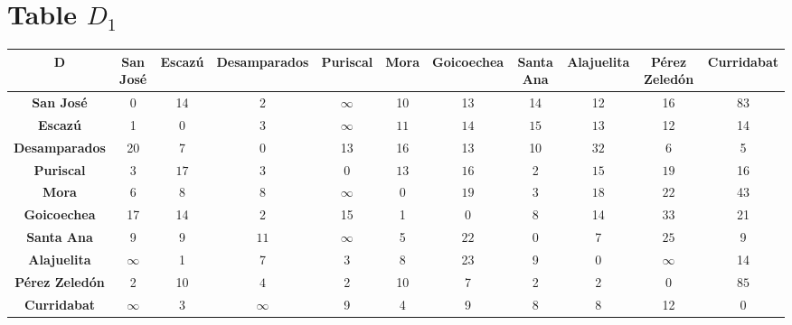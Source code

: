 \documentclass{article}
\begin{document}
\section{Table $D_{1}$}
\begin{center}
    \begin{tabular}{|c||c|c|c|c|c|c|c|c|c|c|}
        \hline
        \textbf{D} & \textbf{San José} & \textbf{Escazú} & \textbf{Desamparados} & \textbf{Puriscal} & \textbf{Mora} & \textbf{Goicoechea} & \textbf{Santa Ana} & \textbf{Alajuelita} & \textbf{Pérez Zeledón} & \textbf{Curridabat} \\
        \hline
        \hline
        \textbf{San José}& 0 & 14 & 2 & $\infty$ & 10 & 13 & 14 & 12 & 16 & 83 \\
        \hline
        \textbf{Escazú}& 1 & 0 & \cellcolor[HTML]{D74894}$3$ & $\infty$ & \cellcolor[HTML]{D74894}$11$ & \cellcolor[HTML]{D74894}$14$ & \cellcolor[HTML]{D74894}$15$ & \cellcolor[HTML]{D74894}$13$ & 12 & 14 \\
        \hline
        \textbf{Desamparados}& 20 & 7 & 0 & 13 & 16 & 13 & 10 & \cellcolor[HTML]{D74894}$32$ & 6 & 5 \\
        \hline
        \textbf{Puriscal}& 3 & \cellcolor[HTML]{D74894}$17$ & 3 & 0 & \cellcolor[HTML]{D74894}$13$ & \cellcolor[HTML]{D74894}$16$ & 2 & \cellcolor[HTML]{D74894}$15$ & \cellcolor[HTML]{D74894}$19$ & 16 \\
        \hline
        \textbf{Mora}& 6 & 8 & \cellcolor[HTML]{D74894}$8$ & $\infty$ & 0 & \cellcolor[HTML]{D74894}$19$ & 3 & \cellcolor[HTML]{D74894}$18$ & \cellcolor[HTML]{D74894}$22$ & 43 \\
        \hline
        \textbf{Goicoechea}& 17 & 14 & 2 & 15 & 1 & 0 & 8 & 14 & \cellcolor[HTML]{D74894}$33$ & 21 \\
        \hline
        \textbf{Santa Ana}& 9 & 9 & \cellcolor[HTML]{D74894}$11$ & $\infty$ & 5 & \cellcolor[HTML]{D74894}$22$ & 0 & 7 & \cellcolor[HTML]{D74894}$25$ & 9 \\
        \hline
        \textbf{Alajuelita}& $\infty$ & 1 & 7 & 3 & 8 & 23 & 9 & 0 & $\infty$ & 14 \\
        \hline
        \textbf{Pérez Zeledón}& 2 & 10 & \cellcolor[HTML]{D74894}$4$ & 2 & 10 & 7 & 2 & 2 & 0 & \cellcolor[HTML]{D74894}$85$ \\
        \hline
        \textbf{Curridabat}& $\infty$ & 3 & $\infty$ & 9 & 4 & 9 & 8 & 8 & 12 & 0 \\
        \hline
    \end{tabular}
\end{center}
\end{document}
